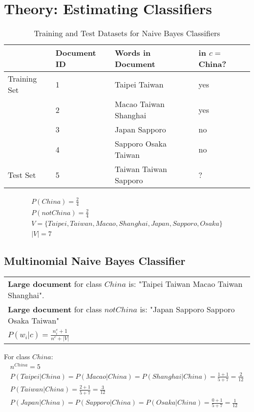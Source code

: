 \documentclass{article}
\begin{document}
\section{Theory: Estimating Classifiers}

\begin{table}[h]
	\centering
	\begin{tabular}{|l|l|l|l|}
	\hline
	& \textbf{Document ID} & \textbf{Words in Document} & \textbf{in $c=$China?} \\
	\hline
	Training Set & 1 & Taipei Taiwan & yes \\
	& 2 & Macao Taiwan Shanghai & yes \\
	& 3 & Japan Sapporo & no \\
	& 4 & Sapporo Osaka Taiwan & no \\
	\hline
	Test Set & 5 & Taiwan Taiwan Sapporo & ? \\
	\hline 
	\end{tabular}
	\caption{Training and Test Datasets for Naive Bayes Classifiers}
	\label{tab:example_problem}
\end{table}

\begin{align}
P(China) = \frac{2}{4} \\
P(notChina) = \frac{2}{4} \\
V = \lbrace Taipei, Taiwan, Macao, Shanghai, Japan, Sapporo, Osaka \rbrace \\
|V| = 7
\end{align}

\subsection{Multinomial Naive Bayes Classifier}

\begin{tabular}{l}
\textbf{Large document} for class $China$ is: "Taipei Taiwan Macao Taiwan Shanghai". \\
\textbf{Large document} for class $notChina$ is: "Japan Sapporo Sapporo Osaka Taiwan" \\
$P(w_i|c) = \frac{n_i^c + 1}{n^c + |V|}$
\end{tabular}

\hspace{2pt}

For class $China$:
\begin{align}
n^{China} = 5 \\
P(Taipei|China) = P(Macao|China) = P(Shanghai|China) = \frac{1 + 1}{5 + 7} = \frac{2}{12} \\
P(Taiwan|China) = \frac{2 + 1}{5 + 7} = \frac{3}{12} \\
P(Japan|China) = P(Sapporo|China) = P(Osaka|China) = \frac{0 + 1}{5 + 7} = \frac{1}{12}
\end{align}
\end{document}

